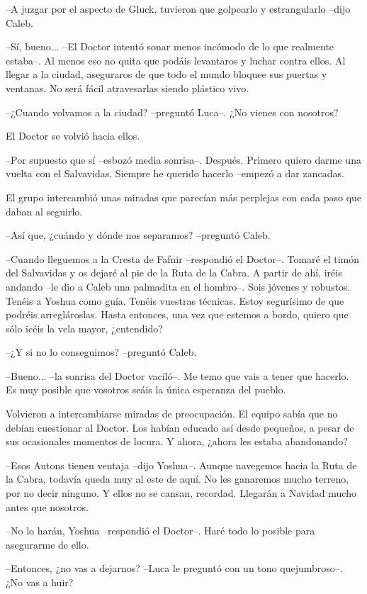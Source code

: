 --A juzgar por el aspecto de Gluck, tuvieron que golpearlo y estrangularlo --dijo Caleb.
 
--Sí, bueno... --El Doctor intentó sonar menos incómodo de lo que realmente estaba--. Al menos eso no quita que podáis levantaros y luchar contra ellos. Al llegar a la ciudad, aseguraros de que todo el mundo bloquee sus puertas y ventanas. No será fácil atravesarlas siendo plástico vivo.
 
--¿Cuando volvamos a la ciudad? --preguntó Luca--. ¿No vienes con nosotros?
 
El Doctor se volvió hacia ellos.
 
--Por supuesto que sí --esbozó media sonrisa--. Después. Primero quiero darme una vuelta con el Salvavidas. Siempre he querido hacerlo --empezó a dar zancadas.
 
El grupo intercambió unas miradas que parecían más perplejas con cada paso que daban al seguirlo.
 
--Así que, ¿cuándo y dónde nos separamos? --preguntó Caleb.
 
--Cuando lleguemos a la Cresta de Fafnir --respondió el Doctor--. Tomaré el timón del Salvavidas y os dejaré al pie de la Ruta de la Cabra. A partir de ahí, iréis andando --le dio a Caleb una palmadita en el hombro--. Sois jóvenes y robustos. Tenéis a Yoshua como guía. Tenéis vuestras técnicas. Estoy segurísimo de que podréis arreglároslas. Hasta entonces, una vez que estemos a bordo, quiero que sólo icéis la vela mayor, ¿entendido?
 
--¿Y si no lo conseguimos? --preguntó Caleb.
 
--Bueno... --la sonrisa del Doctor vaciló--. Me temo que vais a tener que hacerlo. Es muy posible que vosotros seáis la única esperanza del pueblo.
 
Volvieron a intercambiarse miradas de preocupación. El equipo sabía que no debían cuestionar al Doctor. Los habían educado así desde pequeños, a pesar de sus ocasionales momentos de locura. Y ahora, ¿ahora les estaba abandonando?
 
--Esos Autons tienen ventaja --dijo Yoshua--. Aunque navegemos hacia la Ruta de la Cabra, todavía queda muy al este de aquí. No les ganaremos mucho terreno, por no decir ninguno. Y ellos no se cansan, recordad. Llegarán a Navidad mucho antes que nosotros.
 
--No lo harán, Yoshua --respondió el Doctor--. Haré todo lo posible para asegurarme de ello.
 
--Entonces, ¿no vas a dejarnos? --Luca le preguntó con un tono quejumbroso--. ¿No vas a huir?
 

